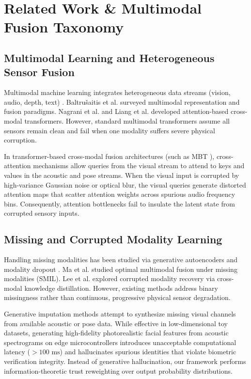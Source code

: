 \documentclass[conference]{IEEEtran}
\begin{document}
\section{Related Work & Multimodal Fusion Taxonomy}
\subsection{Multimodal Learning and Heterogeneous Sensor Fusion}
Multimodal machine learning integrates heterogeneous data streams (vision, audio, depth, text) \cite{b6, b7}. Baltrušaitis et al. \cite{b8} surveyed multimodal representation and fusion paradigms. Nagrani et al. \cite{b9} and Liang et al. \cite{b10} developed attention-based cross-modal transformers. However, standard multimodal transformers assume all sensors remain clean and fail when one modality suffers severe physical corruption.

In transformer-based cross-modal fusion architectures (such as MBT \cite{b9}), cross-attention mechanisms allow queries from the visual stream to attend to keys and values in the acoustic and pose streams. When the visual input is corrupted by high-variance Gaussian noise or optical blur, the visual queries generate distorted attention maps that scatter attention weights across spurious audio frequency bins. Consequently, attention bottlenecks fail to insulate the latent state from corrupted sensory inputs.

\subsection{Missing and Corrupted Modality Learning}
Handling missing modalities has been studied via generative autoencoders \cite{b11} and modality dropout \cite{b12}. Ma et al. \cite{b13} studied optimal multimodal fusion under missing modalities (SMIL). Lee et al. \cite{b14} explored corrupted modality recovery via cross-modal knowledge distillation. However, existing methods address binary missingness rather than continuous, progressive physical sensor degradation.

Generative imputation methods attempt to synthesize missing visual channels from available acoustic or pose data. While effective in low-dimensional toy datasets, generating high-fidelity photorealistic facial features from acoustic spectrograms on edge microcontrollers introduces unacceptable computational latency ($>100\text{ ms}$) and hallucinates spurious identities that violate biometric verification integrity. Instead of generative hallucination, our framework performs information-theoretic trust reweighting over output probability distributions.
\end{document}
